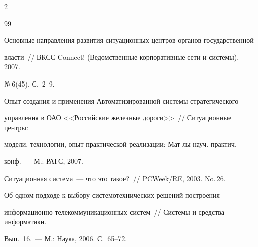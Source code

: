 \begin{multicols}{2}
{\small\frenchspacing


{%




\begin{thebibliography}{99}












Основные направления развития ситуационных центров органов государственной 


власти~// ВКСС Connect! (Ведомственные корпоративные сети и системы), 2007. 


№\,6(45). С.~2--9.









Опыт создания и применения Автоматизированной системы стратегического 


управления в ОАО <<Российские железные дороги>>~// Ситуационные центры: 


модели, технологии, опыт практической реализации: Мат-лы науч.-практич. 


конф.~--- М.: РАГС, 2007.









Ситуационная система~--- что это такое?~// PCWeek/RE, 2003. No.\,26.









Об одном подходе к выбору системотехнических решений построения 


информационно-те\-ле\-ком\-му\-никационных систем~// Системы и средства информатики. 


Вып.~16.~--- М.: Наука, 2006. С.~65--72.













\end{thebibliography}}}
\end{multicols}
